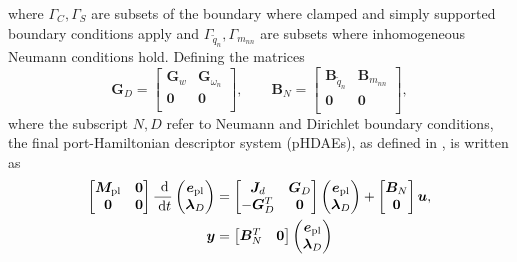 \documentclass[letterpaper, 10 pt, conference]{ieeeconf}
\begin{document}
where $\Gamma_{C},\Gamma_{S}$ are subsets of the boundary where clamped and simply supported boundary conditions apply and $\Gamma_{\widetilde{q}_n},\Gamma_{m_{nn}}$ are subsets where inhomogeneous Neumann conditions hold. Defining the matrices 
\[\bm{G}_D = \begin{bmatrix}
\bm{G}_{w} & \bm{G}_{\omega_n} \\
\bm{0} & \bm{0}  \\
\end{bmatrix}, \qquad 
\bm{B}_N = \begin{bmatrix}
\bm{B}_{\widetilde{q}_n} & \bm{B}_{m_{nn}} \\
\bm{0} & \bm{0}  \\
\end{bmatrix},
\]
 where the subscript $N, D$ refer to Neumann and Dirichlet boundary conditions, the final port-Hamiltonian descriptor system (pHDAEs), as defined in \cite{beattie2018linear}, is written as
\begin{equation}
\begin{aligned}
\label{eq:discr_pl}
\begin{bmatrix}
\bm{M}_{\text{pl}} & \bm{0} \\
\bm{0} & \bm{0} \\
\end{bmatrix} \frac{\d}{\d t}
\begin{pmatrix}
\bm{e}_{\text{pl}}\\
\bm{\lambda}_D \\
\end{pmatrix}
&= \begin{bmatrix}
\bm{J}_d & \bm{G}_D\\
-\bm{G}_D^T & \bm{0} \\
\end{bmatrix}
\begin{pmatrix}
\bm{e}_{\text{pl}}\\
\bm{\lambda}_D \\
\end{pmatrix} + \begin{bmatrix}
\bm{B}_N\\
\bm{0} \\
\end{bmatrix}
\bm{u}, \\
\bm{y} &= \begin{bmatrix}
\bm{B}_N^T & \bm{0} \\ \end{bmatrix}
\begin{pmatrix}
\bm{e}_{\text{pl}}\\
\bm{\lambda}_D \\
\end{pmatrix}
\end{aligned}
\end{equation}
\end{document}

